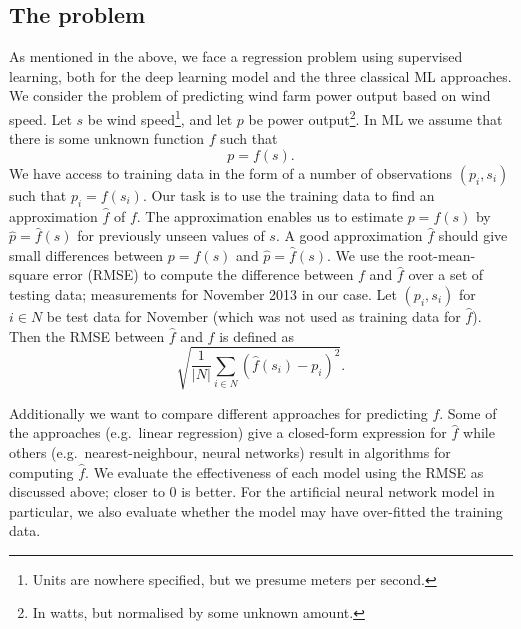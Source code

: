 \documentclass[11pt]{article}
\begin{document}
\subsection*{The problem}
As mentioned in the above, we face a regression problem using supervised learning, both for the deep learning model and the three classical ML approaches. We consider the problem of predicting wind farm power output based on wind speed.
Let $s$ be wind speed\footnote{Units are nowhere specified, but we presume meters per second.}, and let $p$ be power output\footnote{In watts, but normalised by some unknown amount.}. In ML we assume that there is some unknown function $f$ such that
\begin{equation*}
  p = f(s).
\end{equation*}
We have access to training data in the form of a number of observations $(p_i, s_i)$ such that $p_i = f(s_i)$.
Our task is to use the training data to find an approximation $\hat{f}$ of $f$.
The approximation enables us to estimate $p = f(s)$ by $\hat{p} = \hat{f}(s)$ for previously unseen values of $s$.
A good approximation $\hat{f}$ should give small differences between $p = f(s)$ and $\hat{p} = \hat{f}(s)$.
We use the root-mean-square error (RMSE) to compute the difference between $f$ and $\hat{f}$ over a set of testing data; measurements for November 2013 in our case.
Let $(p_i, s_i)$ for $i \in N$ be test data for November (which was not used as training data for $\hat{f}$).
Then the RMSE between $\hat{f}$ and $f$ is defined as
\begin{equation*}
  \sqrt{\frac{1}{|N|} \sum_{i \in N} \left(\hat{f}(s_i) - p_i\right)^2}.
\end{equation*}

Additionally we want to compare different approaches for predicting $f$.
Some of the approaches (e.g.\ linear regression) give a closed-form expression for $\hat{f}$ while others (e.g.\ nearest-neighbour, neural networks) result in algorithms for computing $\hat{f}$.
We evaluate the effectiveness of each model using the RMSE as discussed above; closer to $0$ is better.
For the artificial neural network model in particular, we also evaluate whether the model may have over-fitted the training data.

\end{document}
